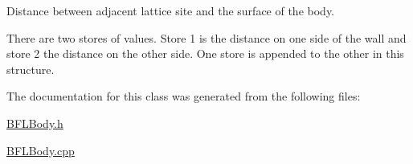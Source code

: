 Distance between adjacent lattice site and the surface of the body. 

There are two stores of values. Store 1 is the distance on one side of the wall and store 2 the distance on the other side. One store is appended to the other in this structure. 

The documentation for this class was generated from the following files\+:\begin{DoxyCompactItemize}
\item 
\hyperlink{_b_f_l_body_8h}{B\+F\+L\+Body.\+h}\item 
\hyperlink{_b_f_l_body_8cpp}{B\+F\+L\+Body.\+cpp}\end{DoxyCompactItemize}
